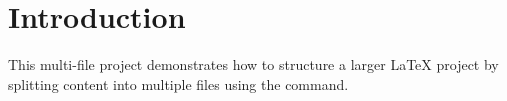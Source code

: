 \section{Introduction}
This multi-file project demonstrates how to structure a larger LaTeX project by splitting content into multiple files using the \texttt{} command.


